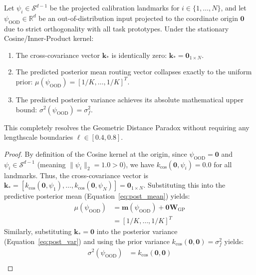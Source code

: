 \begin{enumerate}
    \begin{proposition}
    \label{prop:cosine_orthogonality}
    Let $\psi_i \in \mathcal{S}^{d-1}$ be the projected calibration landmarks for $i \in \{1,\dots,N\}$, and let $\psi_{\text{OOD}} \in \mathbb{R}^d$ be an out-of-distribution input projected to the coordinate origin $\mathbf{0}$ due to strict orthogonality with all task prototypes. Under the stationary Cosine/Inner-Product kernel:
    \begin{enumerate}
        \item The cross-covariance vector $\mathbf{k}_*$ is identically zero: $\mathbf{k}_* = \mathbf{0}_{1 \times N}$.
        \item The predicted posterior mean routing vector collapses exactly to the uniform prior: $\mu(\psi_{\text{OOD}}) = [1/K, \dots, 1/K]^T$.
        \item The predicted posterior variance achieves its absolute mathematical upper bound: $\sigma^2(\psi_{\text{OOD}}) = \sigma_f^2$.
    \end{enumerate}
    This completely resolves the Geometric Distance Paradox without requiring any lengthscale boundaries $\ell \in [0.4, 0.8]$.
    \end{proposition}
    \begin{proof}
    By definition of the Cosine kernel at the origin, since $\psi_{\text{OOD}} = \mathbf{0}$ and $\psi_i \in \mathcal{S}^{d-1}$ (meaning $\|\psi_i\|_2 = 1.0 > 0$), we have $k_{\text{cos}}(\mathbf{0}, \psi_i) = 0.0$ for all landmarks. Thus, the cross-covariance vector is $\mathbf{k}_* = [k_{\text{cos}}(\mathbf{0}, \psi_1), \dots, k_{\text{cos}}(\mathbf{0}, \psi_N)] = \mathbf{0}_{1 \times N}$.
    Substituting this into the predictive posterior mean (Equation~\ref{eq:post_mean}) yields:
    \begin{equation}
    \begin{aligned}
    \mu(\psi_{\text{OOD}}) &= \mathbf{m}(\psi_{\text{OOD}}) + \mathbf{0} \mathbf{W}_{\text{GP}} \\
    &= [1/K, \dots, 1/K]^T
    \end{aligned}
    \end{equation}
    Similarly, substituting $\mathbf{k}_* = \mathbf{0}$ into the posterior variance (Equation~\ref{eq:post_var}) and using the prior variance $k_{\text{cos}}(\mathbf{0}, \mathbf{0}) = \sigma_f^2$ yields:
    \begin{equation}
    \begin{aligned}
    \sigma^2(\psi_{\text{OOD}}) &= k_{\text{cos}}(\mathbf{0}, \mathbf{0}) \\

\end{aligned}
\end{equation}
\end{proof}
\end{enumerate}
